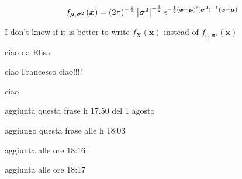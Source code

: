 \documentclass{article}
\begin{document}
\begin{equation*}
f_{\boldsymbol{\mu },\boldsymbol{\sigma }^{2}}\left( \boldsymbol{x}\right)
=(2\pi )^{-\frac{\bar{n}}{2}}\left\vert \boldsymbol{\sigma }^{2}\right\vert
^{-\frac{1}{2}}e^{-\frac{1}{2}\left( \boldsymbol{x}-\boldsymbol{\mu }\right)
^{\prime }(\boldsymbol{\sigma }^{2})^{-1}\left( \boldsymbol{x}-\boldsymbol{%
\mu }\right) }
\end{equation*}

I don't know if it is better to write $f_{\boldsymbol{X}}\left( \boldsymbol{x%
}\right) $ instead of $f_{\boldsymbol{\mu },\boldsymbol{\sigma }^{2}}\left( 
\boldsymbol{x}\right) $

\bigskip

ciao da Elisa

\bigskip

ciao Francesco ciao!!!!

\bigskip

ciao

aggiunta questa frase h 17.50 del 1 agosto

\bigskip

aggiungo questa frase alle h 18:03

\bigskip

aggiunta alle ore 18:16

\bigskip

aggiunta alle ore 18:17
\end{document}
